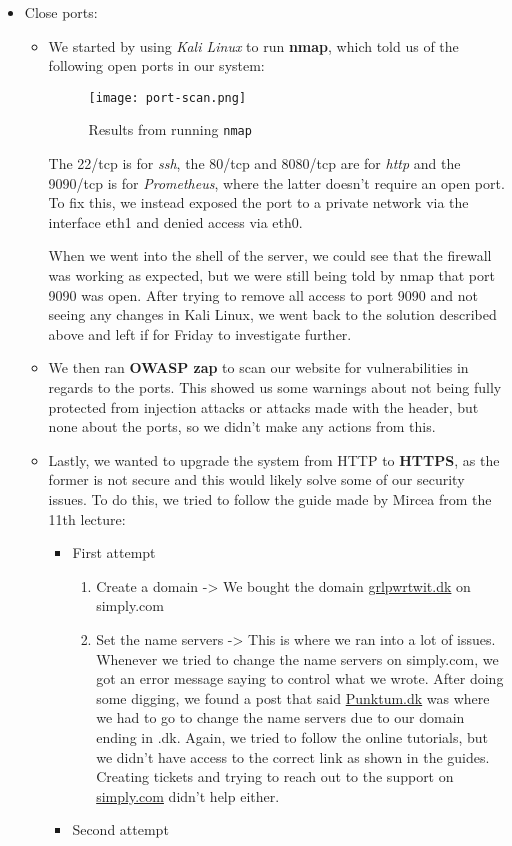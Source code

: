 \begin{itemize}
\item Close ports:

    \begin{itemize}
        \item We started by using \emph{Kali Linux} to run \textbf{nmap}, which told us of the following open ports in our system:
        \begin{figure}[H]
        \centering
        \texttt{[image: port-scan.png]}
        \caption{Results from running \texttt{nmap}}
        \end{figure}
        The 22/tcp is for \emph{ssh}, the 80/tcp and 8080/tcp are for \emph{http} and the 9090/tcp is for \emph{Prometheus}, where the latter doesn't require an open port. To fix this, we instead exposed the port to a private network via the interface eth1 and denied access via eth0.

        When we went into the shell of the server, we could see that the firewall was working as expected, but we were still being told by nmap that port 9090 was open. After trying to remove all access to port 9090 and not seeing any changes in Kali Linux, we went back to the solution described above and left if for Friday to investigate further.

        \item We then ran \textbf{OWASP zap} to scan our website for vulnerabilities in regards to the ports. This showed us some warnings about not being fully protected from injection attacks or attacks made with the header, but none about the ports, so we didn't make any actions from this.
        \item Lastly, we wanted to upgrade the system from HTTP to \textbf{HTTPS}, as the former is not secure and this would likely solve some of our security issues. To do this, we tried to follow the guide made by Mircea from the 11th lecture:

        \begin{itemize}
            \item First attempt

            \begin{enumerate}
                \item Create a domain -> We bought the domain \href{http://grlpwrtwit.dk}{grlpwrtwit.dk} on simply.com
                \item Set the name servers -> This is where we ran into a lot of issues. Whenever we tried to change the name servers on simply.com, we got an error message saying to control what we wrote. After doing some digging, we found a post that said \href{http://Punktum.dk}{Punktum.dk} was where we had to go to change the name servers due to our domain ending in .dk. Again, we tried to follow the online tutorials, but we didn't have access to the correct link as shown in the guides.
                Creating tickets and trying to reach out to the support on      \href{http://simply.com}{simply.com} didn't help either.
            \end{enumerate}
            \item Second attempt


\end{itemize}
\end{itemize}
\end{itemize}

